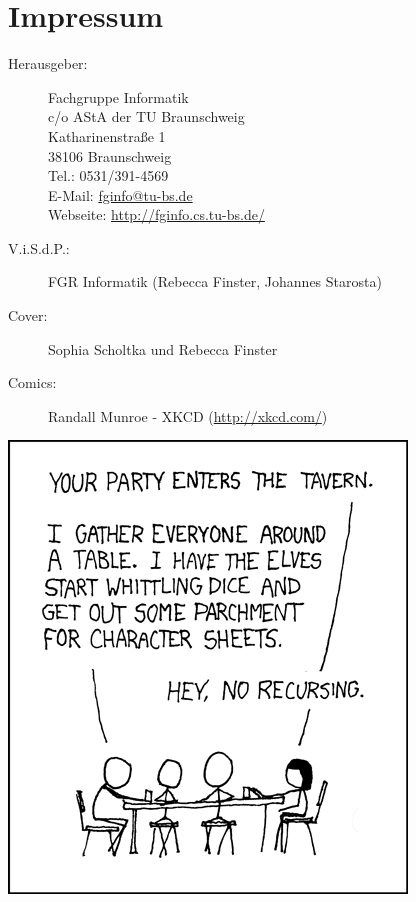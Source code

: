 \section{Impressum}
\label{impressum}
\begin{description}
\item[Herausgeber:]
	Fachgruppe Informatik\\
	c/o AStA der TU Braunschweig\\
	Katharinenstraße 1\\
	38106 Braunschweig\\
	Tel.: 0531/391-4569\\
	E-Mail: \url{fginfo@tu-bs.de}\\
	Webseite: \url{http://fginfo.cs.tu-bs.de/}
\item[V.i.S.d.P.:]  %
  FGR Informatik (Rebecca Finster, Johannes Starosta)
\item[Cover:] Sophia Scholtka und Rebecca Finster
\item[Comics:] Randall Munroe - XKCD (\url{http://xkcd.com/})
\end{description}
\begin{center}
		\includegraphics[totalheight=10cm]{bilder/XKCD/tabletop_roleplaying}
\end{center}